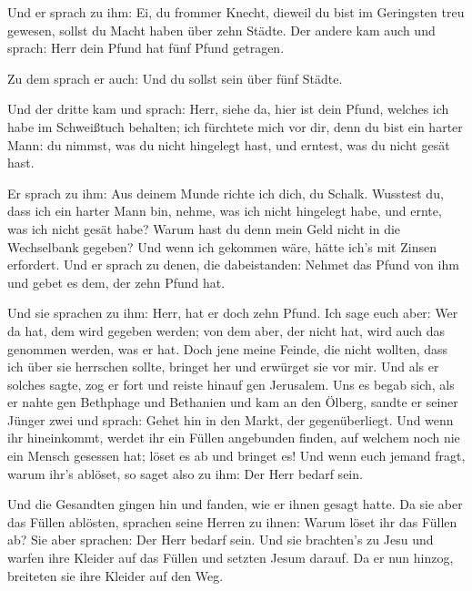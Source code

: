 Und er sprach zu ihm: Ei, du frommer Knecht, dieweil du
bist im Geringsten treu gewesen, sollst du Macht haben über zehn Städte.
 Der andere kam auch und sprach: Herr dein Pfund hat fünf
Pfund getragen.

 Zu dem sprach er auch: Und du sollst sein über fünf
Städte.

 Und der dritte kam und sprach: Herr, siehe da, hier ist
dein Pfund, welches ich habe im Schweißtuch behalten; 
ich fürchtete mich vor dir, denn du bist ein harter Mann: du nimmst, was
du nicht hingelegt hast, und erntest, was du nicht gesät hast.

 Er sprach zu ihm: Aus deinem Munde richte ich dich, du
Schalk. Wusstest du, dass ich ein harter Mann bin, nehme, was ich nicht
hingelegt habe, und ernte, was ich nicht gesät habe? 
Warum hast du denn mein Geld nicht in die Wechselbank gegeben? Und wenn
ich gekommen wäre, hätte ich's mit Zinsen erfordert.  Und
er sprach zu denen, die dabeistanden: Nehmet das Pfund von ihm und gebet
es dem, der zehn Pfund hat.

 Und sie sprachen zu ihm: Herr, hat er doch zehn Pfund.
 Ich sage euch aber: Wer da hat, dem wird gegeben werden;
von dem aber, der nicht hat, wird auch das genommen werden, was er hat.
 Doch jene meine Feinde, die nicht wollten, dass ich über
sie herrschen sollte, bringet her und erwürget sie vor mir.
 Und als er solches sagte, zog er fort und reiste hinauf
gen Jerusalem.  Uns es begab sich, als er nahte gen
Bethphage und Bethanien und kam an den Ölberg, sandte er seiner Jünger
zwei  und sprach: Gehet hin in den Markt, der
gegenüberliegt. Und wenn ihr hineinkommt, werdet ihr ein Füllen
angebunden finden, auf welchem noch nie ein Mensch gesessen hat; löset
es ab und bringet es!  Und wenn euch jemand fragt, warum
ihr's ablöset, so saget also zu ihm: Der Herr bedarf sein.

 Und die Gesandten gingen hin und fanden, wie er ihnen
gesagt hatte.  Da sie aber das Füllen ablösten, sprachen
seine Herren zu ihnen: Warum löset ihr das Füllen ab? 
Sie aber sprachen: Der Herr bedarf sein.  Und sie
brachten's zu Jesu und warfen ihre Kleider auf das Füllen und setzten
Jesum darauf.  Da er nun hinzog, breiteten sie ihre
Kleider auf den Weg.

